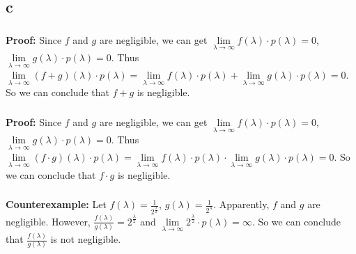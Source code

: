 \documentclass[12pt]{article}
\begin{document}
\subsection{c}
\subsubsection{}
\textbf{Proof:}
\newline
Since $f$ and $g$ are negligible, we can get $\lim\limits_{\lambda\rightarrow\infty}f(\lambda)\cdot p(\lambda)=0$, $\lim\limits_{\lambda\rightarrow\infty}g(\lambda)\cdot p(\lambda)=0$. Thus
$\lim\limits_{\lambda\rightarrow\infty}(f+g)(\lambda)\cdot p(\lambda)=\lim\limits_{\lambda\rightarrow\infty}f(\lambda)\cdot p(\lambda)+\lim\limits_{\lambda\rightarrow\infty}g(\lambda)\cdot p(\lambda)=0$.
So we can conclude that $f+g$ is negligible.
\subsubsection{}
\textbf{Proof:}
\newline
Since $f$ and $g$ are negligible, we can get $\lim\limits_{\lambda\rightarrow\infty}f(\lambda)\cdot p(\lambda)=0$, $\lim\limits_{\lambda\rightarrow\infty}g(\lambda)\cdot p(\lambda)=0$. Thus
$\lim\limits_{\lambda\rightarrow\infty}(f\cdot g)(\lambda)\cdot p(\lambda)=\lim\limits_{\lambda\rightarrow\infty}f(\lambda)\cdot p(\lambda)\cdot\lim\limits_{\lambda\rightarrow\infty}g(\lambda)\cdot p(\lambda)=0$.
So we can conclude that $f\cdot g$ is negligible.
\subsubsection{}
\textbf{Counterexample:}
\newline
Let $f(\lambda)=\frac{1}{2^{\frac{\lambda}{2}}}$, $g(\lambda)=\frac{1}{2^\lambda}$. Apparently, $f$ and $g$ are negligible. However, $\frac{f(\lambda)}{g(\lambda)}=2^{\frac{\lambda}{2}}$ and $\lim\limits_{\lambda\rightarrow\infty}2^\frac{\lambda}{2}\cdot p(\lambda)=\infty$.
\newline
So we can conclude that $\frac{f(\lambda)}{g(\lambda)}$ is not negligible.
\end{document}
